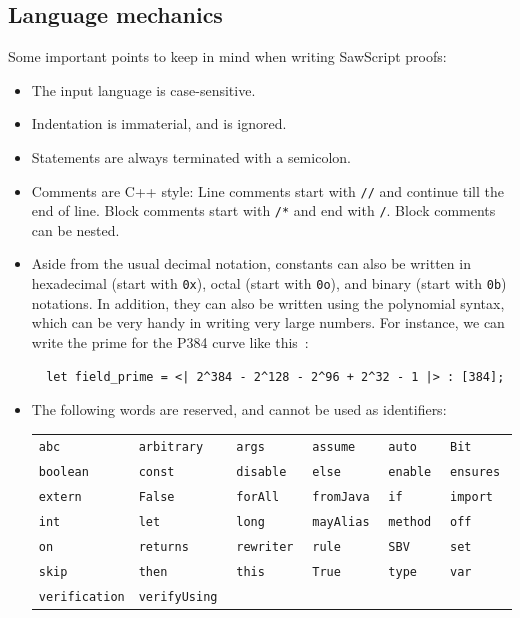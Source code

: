 \documentclass[12pt]{galois-whitepaper}
\newcommand{\sawScript}{{\sc SawScript}\xspace}
\begin{document}
\subsection{Language mechanics}
Some important points to keep in mind when writing \sawScript proofs:
\begin{itemize}
\item The input language is case-sensitive.
\item Indentation is immaterial, and is ignored.
\item Statements are always terminated with a semicolon.
\item Comments are C++ style: Line comments start with {\tt //} and continue till the end of line. Block
comments start with {\tt /*} and end with {\tt */}. Block comments can be nested.
\item Aside from the usual decimal notation, constants can also be written in hexadecimal (start with {\tt 0x}), octal (start with {\tt 0o}),
and binary (start with {\tt 0b}) notations. In addition,
they can also be written using the polynomial syntax, which can be very handy in writing very large numbers.
For instance, we can write the prime for the P384 curve like this~\cite[Section 2.8.1]{sec2}:
\begin{Verbatim}
  let field_prime = <| 2^384 - 2^128 - 2^96 + 2^32 - 1 |> : [384];
\end{Verbatim}
\item The following words are reserved, and cannot be used as identifiers:

\begin{tabular}{llllll}
{\tt abc         } & {\tt arbitrary   } & {\tt args        } & {\tt assume      } & {\tt auto        } & {\tt Bit         } \\
{\tt boolean     } & {\tt const       } & {\tt disable     } & {\tt else        } & {\tt enable      } & {\tt ensures     } \\
{\tt extern      } & {\tt False       } & {\tt forAll      } & {\tt fromJava    } & {\tt if          } & {\tt import      } \\
{\tt int         } & {\tt let         } & {\tt long        } & {\tt mayAlias    } & {\tt method      } & {\tt off         } \\
{\tt on          } & {\tt returns     } & {\tt rewriter    } & {\tt rule        } & {\tt SBV         } & {\tt set         } \\
{\tt skip        } & {\tt then        } & {\tt this        } & {\tt True        } & {\tt type        } & {\tt var         } \\
{\tt verification} & {\tt verifyUsing } 
\end{tabular}


\end{itemize}
\end{document}
